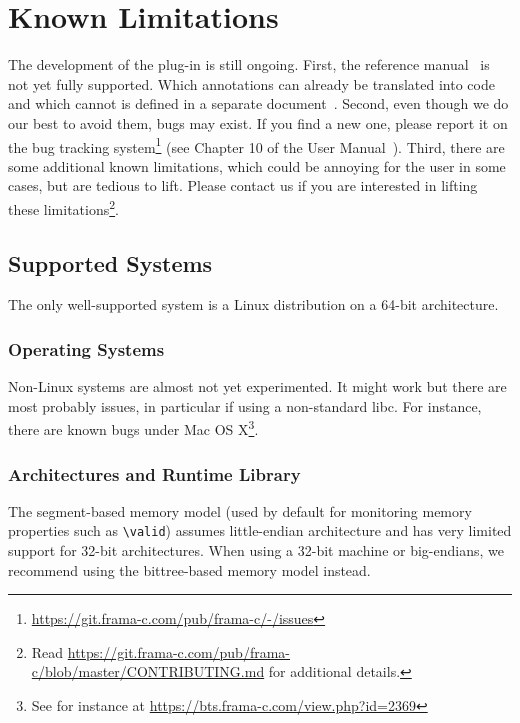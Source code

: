 \chapter{Known Limitations}

The development of the \eacsl plug-in is still ongoing. First, the \eacsl
reference manual~\cite{eacsl} is not yet fully supported. Which annotations can
already be translated into \C code and which cannot is defined in a separate
document~\cite{eacsl-implem}. Second, even though we do our best to avoid them,
bugs may exist. If you find a new one, please report it on the bug tracking
system\footnote{\url{https://git.frama-c.com/pub/frama-c/-/issues}} (see Chapter
10 of the \framac User Manual~\cite{userman}). Third, there are some additional
known limitations, which could be annoying for the user in some cases, but are
tedious to lift. Please contact us if you are interested in lifting these
limitations\footnote{Read
  \url{https://git.frama-c.com/pub/frama-c/blob/master/CONTRIBUTING.md} for
  additional details.}.

\section{Supported Systems}

\begin{important}
The only well-supported system is a Linux distribution on a 64-bit architecture.
\end{important}

\subsection{Operating Systems}

Non-Linux systems are almost not yet experimented. It might work but there are
most probably issues, in particular if using a non-standard
libc. For instance, there are known bugs under Mac OS
X\footnote{See for instance at
  \url{https://bts.frama-c.com/view.php?id=2369}}.

\subsection{Architectures and Runtime Library}

The segment-based memory model (used by default for monitoring memory properties
such as \lstinline|\valid|) assumes little-endian architecture and has very
limited support for 32-bit architectures. When using a 32-bit machine or
big-endians, we recommend using the bittree-based memory model instead.


